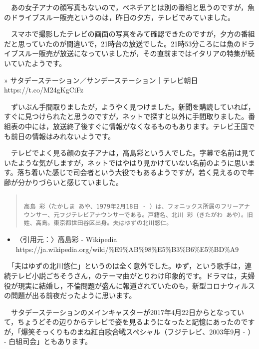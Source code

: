 \documentclass[]{ltjarticle}
\providecommand{\tightlist}{%
  \setlength{\itemsep}{0pt}\setlength{\parskip}{0pt}}
\begin{document}
　あの女子アナの顔写真もないので，ベネチアとは別の番組と思うのですが，魚のドライブスルー販売というのは，昨日の夕方，テレビでみていました。

　スマホで撮影したテレビの画面の写真をみて確認できたのですが，夕方の番組だと思っていたのが間違いで，21時台の放送でした。21時53分ころには魚のドライブスルー販売が放送になっていましたが，その直前まではイタリアの特集が続いていたようです。

» サタデーステーション／サンデーステーション｜テレビ朝日
https://t.co/M24gKgCiFz

　ずいぶん手間取りましたが，ようやく見つけました。新聞を購読していれば，すぐに見つけられたと思うのですが，ネットで探すと以外に手間取りました。番組表の中には，放送終了後すぐに情報がなくなるものもあります。テレビ王国でも前日の情報はみれないようです。

　テレビでよく見る顔の女子アナは，高島彩という人でした。字幕で名前は見ていたような気がしますが，ネットではやはり見かけていない名前のように思います。落ち着いた感じで司会者という大役でもあるようですが，若く見えるので年齢が分かりづらいと感じていました。

\begingroup\fontsize{9pt}{10pt}\selectfont
\begin{quote}
\begin{verbatim}

高島 彩（たかしま あや、1979年2月18日 - ）は、フォニックス所属のフリーアナウンサー、元フジテレビアナウンサーである。戸籍名、北川 彩（きたがわ あや）。旧姓、高島。東京都世田谷区出身。夫はゆずの北川悠仁。

\end{verbatim}
\end{quote}\endgroup


\begin{itemize}
\tightlist
\item
  〈引用元：〉高島彩 - Wikipedia
  https://ja.wikipedia.org/wiki/\%E9\%AB\%98\%E5\%B3\%B6\%E5\%BD\%A9
\end{itemize}

　「夫はゆずの北川悠仁」というのは全く意外でした。ゆず，という歌手は，連続テレビ小説ごちそうさん，のテーマ曲がとりわけ印象的です。ドラマは，夫婦役が現実に結婚し，不倫問題が盛んに報道されていたのも，新型コロナウィルスの問題が出る前夜だったように思います。

　サタデーステーションのメインキャスターが2017年4月22日からとなっていて，ちょうどその辺りからテレビで姿を見るようになったと記憶にあったのですが，「爆笑そっくりものまね紅白歌合戦スペシャル（フジテレビ、2003年9月
- ） - 白組司会」ともあります。
\end{document}
